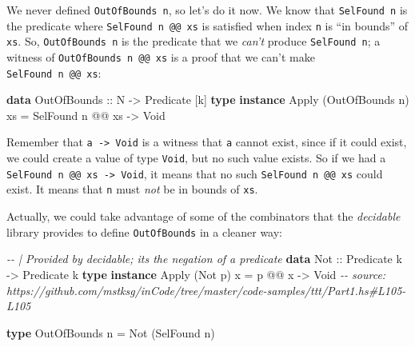 \documentclass[]{article}
\newenvironment{Shaded}{}{}
\newcommand{\CommentTok}[1]{\textcolor[rgb]{0.38,0.63,0.69}{\textit{#1}}}
\newcommand{\DataTypeTok}[1]{\textcolor[rgb]{0.56,0.13,0.00}{#1}}
\newcommand{\KeywordTok}[1]{\textcolor[rgb]{0.00,0.44,0.13}{\textbf{#1}}}
\newcommand{\NormalTok}[1]{#1}
\newcommand{\OperatorTok}[1]{\textcolor[rgb]{0.40,0.40,0.40}{#1}}
\newcommand{\OtherTok}[1]{\textcolor[rgb]{0.00,0.44,0.13}{#1}}
\begin{document}
We never defined \texttt{OutOfBounds\ n}, so let's do it now. We know that
\texttt{SelFound\ n} is the predicate where \texttt{SelFound\ n\ @@\ xs} is
satisfied when index \texttt{n} is ``in bounds'' of \texttt{xs}. So,
\texttt{OutOfBounds\ n} is the predicate that we \emph{can't} produce
\texttt{SelFound\ n}; a witness of \texttt{OutOfBounds\ n\ @@\ xs} is a proof
that we can't make \texttt{SelFound\ n\ @@\ xs}:

\begin{Shaded}
\begin{Highlighting}[]
\KeywordTok{data} \DataTypeTok{OutOfBounds}\OtherTok{ ::} \DataTypeTok{N} \OtherTok{{-}\textgreater{}} \DataTypeTok{Predicate}\NormalTok{ [k]}
\KeywordTok{type} \KeywordTok{instance} \DataTypeTok{Apply}\NormalTok{ (}\DataTypeTok{OutOfBounds}\NormalTok{ n) xs }\OtherTok{=} \DataTypeTok{SelFound}\NormalTok{ n }\OperatorTok{@@}\NormalTok{ xs }\OtherTok{{-}\textgreater{}} \DataTypeTok{Void}
\end{Highlighting}
\end{Shaded}

Remember that \texttt{a\ -\textgreater{}\ Void} is a witness that \texttt{a}
cannot exist, since if it could exist, we could create a value of type
\texttt{Void}, but no such value exists. So if we had a
\texttt{SelFound\ n\ @@\ xs\ -\textgreater{}\ Void}, it means that no such
\texttt{SelFound\ n\ @@\ xs} could exist. It means that \texttt{n} must
\emph{not} be in bounds of \texttt{xs}.

Actually, we could take advantage of some of the combinators that the
\emph{decidable} library provides to define \texttt{OutOfBounds} in a cleaner
way:

\begin{Shaded}
\begin{Highlighting}[]
\CommentTok{{-}{-} | Provided by decidable; it\textquotesingle{}s the negation of a predicate}
\KeywordTok{data} \DataTypeTok{Not}\OtherTok{ ::} \DataTypeTok{Predicate}\NormalTok{ k }\OtherTok{{-}\textgreater{}} \DataTypeTok{Predicate}\NormalTok{ k}
\KeywordTok{type} \KeywordTok{instance} \DataTypeTok{Apply}\NormalTok{ (}\DataTypeTok{Not}\NormalTok{ p) x }\OtherTok{=}\NormalTok{ p }\OperatorTok{@@}\NormalTok{ x }\OtherTok{{-}\textgreater{}} \DataTypeTok{Void}
\CommentTok{{-}{-} source: https://github.com/mstksg/inCode/tree/master/code{-}samples/ttt/Part1.hs\#L105{-}L105}

\KeywordTok{type} \DataTypeTok{OutOfBounds}\NormalTok{ n }\OtherTok{=} \DataTypeTok{Not}\NormalTok{ (}\DataTypeTok{SelFound}\NormalTok{ n)}
\end{Highlighting}
\end{Shaded}
\end{document}
